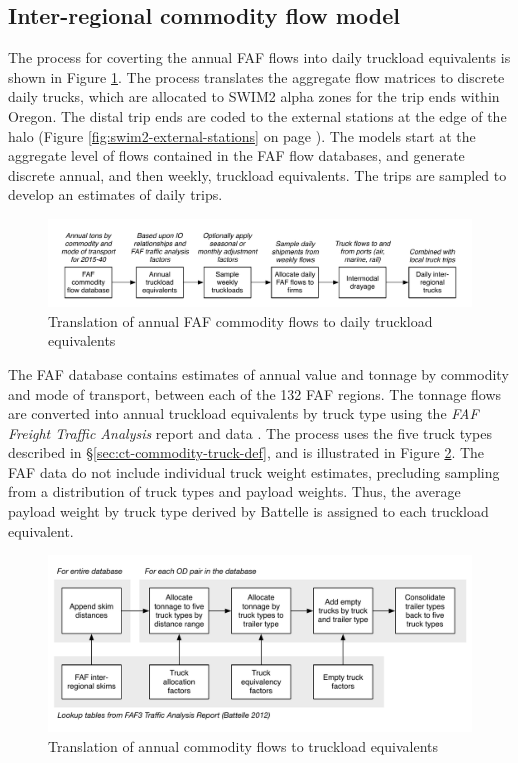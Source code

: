 \subsection{Inter-regional commodity flow model}\label{sec:ct-interregional-flows}
The process for coverting the annual FAF flows into daily truckload equivalents is shown in Figure \ref{fig:ct-faf-conversion}. The process translates the aggregate flow matrices to discrete daily trucks, which are allocated to SWIM2 alpha zones for the trip ends within Oregon. The distal trip ends are coded to the external stations at the edge of the halo (Figure \ref{fig:swim2-external-stations} on page \pageref{fig:swim2-external-stations}). The models start at the aggregate level of flows contained in the FAF flow databases, and generate discrete annual, and then weekly, truckload equivalents. The trips are sampled to develop an estimates of daily trips.

\begin{figure}[!b]
\centering
\includegraphics[width=6.6in]{ct/faf-conversion-process.pdf}
\caption{Translation of annual FAF commodity flows to daily truckload equivalents}
\label{fig:ct-faf-conversion}
\end{figure}

The FAF database contains estimates of annual value and tonnage by commodity and mode of transport, between each of the 132 FAF regions. The tonnage flows are converted into annual truckload equivalents by truck type using the \textit{FAF Freight Traffic Analysis} report and data \citep{battelle11}. The process uses the five truck types described in \S\ref{sec:ct-commodity-truck-def}, and is illustrated in Figure \ref{fig:ct-truckload-equivalents}. The FAF data do not include individual truck weight estimates, precluding sampling from a distribution of truck types and payload weights. Thus, the average payload weight by truck type derived by Battelle is assigned to each truckload equivalent. 

\begin{figure}
\centering
\includegraphics[width=6in]{ct/faf3-truckload-equivalents}
\caption{Translation of annual commodity flows to truckload equivalents}
\label{fig:ct-truckload-equivalents}
\end{figure}

